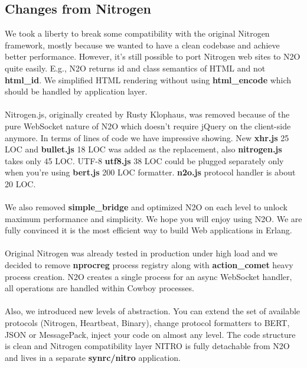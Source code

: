 \newpage
\subsection*{Changes from Nitrogen}
We took a liberty to break some compatibility with the original
Nitrogen framework, mostly because we wanted to have a clean codebase
and achieve better performance. However, it's still possible to port
Nitrogen web sites to N2O quite easily. E.g., N2O returns id and
class semantics of HTML and not {\bf html\_id}.
We simplified HTML rendering without using
{\bf html\_encode} which should be handled by application layer.

\paragraph{}
Nitrogen.js, originally created by Rusty Klophaus, was removed
because of the pure WebSocket nature of N2O which doesn't
require jQuery on the client-side anymore. In terms of lines of code
we have impressive showing. New {\bf xhr.js} 25 LOC and {\bf bullet.js} 18 LOC
was added as the replacement, also {\bf nitrogen.js} takes only 45 LOC.
UTF-8 {\bf utf8.js} 38 LOC could be plugged separately only when you're
using {\bf bert.js} 200 LOC formatter. {\bf n2o.js} protocol handler is about 20 LOC.

\paragraph{}
We also removed {\bf simple\_bridge} and optimized N2O on each level to
unlock maximum performance and simplicity. We hope you will enjoy
using N2O. We are fully convinced it is the most efficient way to
build Web applications in Erlang.

\paragraph{}
Original Nitrogen was already tested in production under high load and we
decided to remove {\bf nprocreg} process registry along
with {\bf action\_comet} heavy process creation. N2O creates a single
process for an async WebSocket handler, all operations
 are handled within Cowboy processes.

\paragraph{}
Also, we introduced new levels of abstraction. You can extend
the set of available protocols (Nitrogen, Heartbeat, Binary),
change protocol formatters to BERT, JSON or MessagePack, inject
your code on almost any level. The code structure
is clean and Nitrogen compatibility layer NITRO is fully detachable
from N2O and lives in a separate {\bf synrc/nitro} application.
